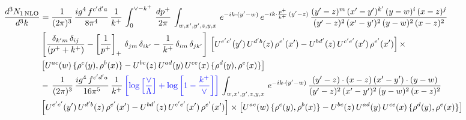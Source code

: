 \documentclass[9pt]{article}
\numberwithin{equation}{section}
\begin{document}
\begin{align}
     \frac{d^{3}N_{1\,\rm NLO}}{d^{3}k} & = \frac{1}{(2\pi)^{3}}\, \frac{ig^{4}\,f^{c'd'a}}{8\pi^{4}}\, \frac{1}{k^{+}}\,\int_{0}^{\vee-k^{+}}\,  \frac{dp^{+}}{2\pi}\, \int_{w,x',y',z,y,x}\, e^{-ik\cdot (y'-w)}\, e^{-ik\cdot \frac{p^{+}}{k^{+}}\,(y'-z)}\,\frac{(y'-z)^{m}\,(x'-y')^{k'}\,(y-w)^{i}\,(x-z)^{j}}{(y'-z)^{2}\,(x'-y')^{2}\,(y-w)^{2}\,(x-z)^{2}}\notag \\ & \left[\frac{\delta_{k'm}\,\delta_{ij}}{(p^{+}+k^{+})}-\left[\frac{1}{p^{+}}\right]_{+}\,\delta_{jm}\,\delta_{ik'}-\frac{1}{k^{+}}\, \delta_{im}\, \delta_{jk'}\right]\, \left[U^{e'c'}(y')\,U^{d'b}(z)\,\rho^{e'}(x')-U^{bd'}(z)\,U^{c'e'}(x')\,\rho^{e'}(x')\right]\times\notag \\ &  \left[U^{ac}(w)\, \{\rho^{c}(y),\rho^{b}(x)\}-U^{bc}(z)\,U^{ad}(y)\,U^{ce}(x)\,\{\rho^{d}(y),\rho^{e}(x)\}\right]\notag \\ & -\,\frac{1}{(2\pi)^{3}}\, \frac{ig^{4}\,f^{c'd'a}}{16\pi^{5}}\, \frac{1}{k^{+}}\,{\color{blue}\left[\log{\left[\frac{\vee}{\Lambda}\right]} + \log{\left[1-\frac{k^{+}}{\vee}\right]}\right]}\, \int_{w,x',y',z,y,x}\, e^{-ik\cdot (y'-w)}\,\frac{(y'-z)\cdot (x-z)\,(x'-y')\cdot (y-w)}{(y'-z)^{2}\,(x'-y')^{2}\,(y-w)^{2}\,(x-z)^{2}}\notag \\ &  \left[U^{e'c'}(y')\,U^{d'b}(z)\,\rho^{e'}(x')-U^{bd'}(z)\,U^{c'e'}(x')\,\rho^{e'}(x')\right]\times  \left[U^{ac}(w)\, \{\rho^{c}(y),\rho^{b}(x)\}-U^{bc}(z)\,U^{ad}(y)\,U^{ce}(x)\,\{\rho^{d}(y),\rho^{e}(x)\}\right]
\end{align} 
\end{document}
